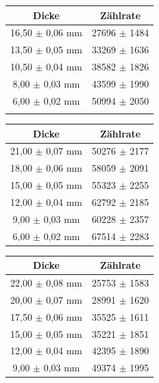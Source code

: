 \documentclass[
	parskip=half,10pt,
	numbers= noenddot, %
	toc=flat, %
	oneside,
	twocolumn,
	]{scrartcl}
\begin{document}
\begin{appendix}
\begin{table}
\begin{small}

\begin{subtable}[b]{.3\textwidth}
\centering
\begin{tabular}{cc}
 Dicke & Zählrate  \\
 \hline 
 16,50 $\pm$ 0,06 mm & 27696 $\pm$ 1484  \\
 13,50 $\pm$ 0,05 mm & 33269 $\pm$ 1636  \\
 10,50 $\pm$ 0,04 mm & 38582 $\pm$ 1826  \\
  8,00 $\pm$ 0,03 mm & 43599 $\pm$ 1990  \\
  6,00 $\pm$ 0,02 mm & 50994 $\pm$ 2050  \\
   &  \\
\end{tabular}
\label{tab:abs_blei}
\end{subtable}
%
\begin{subtable}[b]{.3\textwidth}
\centering
\begin{tabular}{cc}
 Dicke & Zählrate \\
 \hline 
 21,00 $\pm$ 0,07 mm & 50276 $\pm$ 2177  \\
 18,00 $\pm$ 0,06 mm & 58059 $\pm$ 2091  \\
 15,00 $\pm$ 0,05 mm & 55323 $\pm$ 2255  \\
 12,00 $\pm$ 0,04 mm & 62792 $\pm$ 2185  \\
  9,00 $\pm$ 0,03 mm & 60228 $\pm$ 2357  \\
  6,00 $\pm$ 0,02 mm & 67514 $\pm$ 2283  \\
\end{tabular}
\label{tab:abs_alu}
\end{subtable}
%
\begin{subtable}[b]{.3\textwidth}
\centering
\begin{tabular}{cc}
 Dicke & Zählrate \\
 \hline
 22,00 $\pm$ 0,08 mm & 25753 $\pm$ 1583  \\
 20,00 $\pm$ 0,07 mm & 28991 $\pm$ 1620  \\
 17,50 $\pm$ 0,06 mm & 35525 $\pm$ 1611  \\
 15,00 $\pm$ 0,05 mm & 35221 $\pm$ 1851  \\
 12,00 $\pm$ 0,04 mm & 42395 $\pm$ 1890  \\
  9,00 $\pm$ 0,03 mm & 49374 $\pm$ 1995  \\
\end{tabular}
\label{tab:abs_kupfer}
\end{subtable}


\end{small}
\end{table}
\end{appendix}
\end{document}
